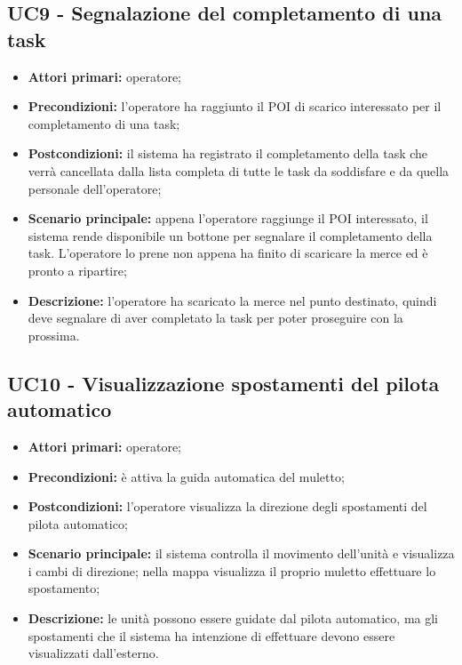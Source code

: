\subsection{UC9 - Segnalazione del completamento di una task}
\begin{itemize}
	\item 	\textbf{Attori primari:} operatore;
	\item 	\textbf{Precondizioni:} l'operatore ha raggiunto il POI di scarico interessato per il completamento di una task;
	\item 	\textbf{Postcondizioni:} il sistema ha registrato il completamento della task che verrà cancellata dalla lista completa di tutte le task da soddisfare e da quella personale dell'operatore;
	\item 	\textbf{Scenario principale:} appena l'operatore raggiunge il POI interessato, il sistema rende disponibile un bottone per segnalare il completamento della task. L'operatore lo prene non appena ha finito di scaricare la merce ed è pronto a ripartire;
	\item 	\textbf{Descrizione:} l'operatore ha scaricato la merce nel punto destinato, quindi deve segnalare di aver completato la task per poter proseguire con la prossima.

\end{itemize}

\subsection{UC10 - Visualizzazione spostamenti del pilota automatico}
\begin{itemize}
	\item 	\textbf{Attori primari:} operatore;
	\item 	\textbf{Precondizioni:} è attiva la guida automatica del muletto;
	\item 	\textbf{Postcondizioni:} l'operatore visualizza la direzione degli spostamenti del pilota automatico;
	\item 	\textbf{Scenario principale:} il sistema controlla il movimento dell'unità e visualizza i cambi di direzione; nella mappa visualizza il proprio muletto effettuare lo spostamento;
	\item 	\textbf{Descrizione:} le unità possono essere guidate dal pilota automatico, ma gli spostamenti che il sistema ha intenzione di effettuare devono essere visualizzati dall'esterno.

\end{itemize}
 
